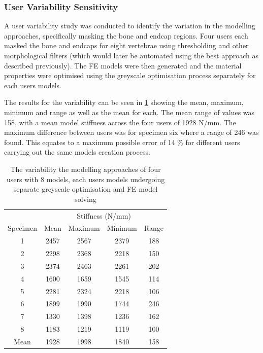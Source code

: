 \subsubsection{User Variability Sensitivity}
\label{sec:uvs}

A user variability study was conducted to identify the variation in the
modelling approaches, specifically masking the bone and endcap regions. Four
users each masked the bone and endcaps for eight vertebrae using thresholding
and other morphological filters (which would later be automated using the best
approach as described previously). The FE models were then generated and
the material properties were optimised using the greyscale optimisation process
separately for each users models.

The results for the variability can be seen in \cref{tab:user_var} showing the
mean, maximum, minimum and range as well as the mean for each. The mean range
of values was 158, with a mean model stiffness across the four users of 1928
N/mm. The maximum difference between users was for specimen six where a range
of 246 was found. This equates to a maximum possible error of 14 \% for
different users carrying out the same models creation process.

\begin{table}[h]
    \centering
    \caption{The variability the modelling approaches of four users with 8
        models, each users models undergoing separate greyscale optimisation
    and FE model solving}
\begin{tabular}{c|c|c|c|c}
         & \multicolumn{4}{c}{Stiffness (N/mm)} \\ 
Specimen & Mean  & Maximum  & Minimum  & Range  \\ \hline
1        & 2457  & 2567     & 2379     & 188    \\
2        & 2298  & 2368     & 2218     & 150    \\
3        & 2374  & 2463     & 2261     & 202    \\
4        & 1600  & 1659     & 1545     & 114    \\
5        & 2281  & 2324     & 2218     & 106    \\
6        & 1899  & 1990     & 1744     & 246    \\
7        & 1330  & 1398     & 1236     & 162    \\
8        & 1183  & 1219     & 1119     & 100    \\ \hline
Mean     & 1928  & 1998   & 1840     & 158 \\ \hline
\end{tabular}
    \label{tab:user_var}
\end{table}

